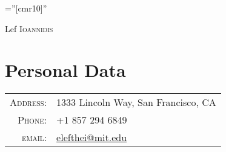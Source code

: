 \documentclass[lettersize,10pt]{article}
\begin{document}
\pagestyle{empty} %
\font\fb=''[cmr10]'' %

\par{\centering
		{\Huge Lef \textsc{Ioannidis}
	}\bigskip\par}

\section{Personal Data}

\begin{tabular}{rl}
    \textsc{Address:}   & 1333 Lincoln Way, San Francisco, CA \\
    \textsc{Phone:}     & +1 857 294 6849\\
    \textsc{email:}     & \href{mailto:elefthei@mit.edu}{elefthei@mit.edu}
\end{tabular}

\end{document}
